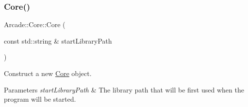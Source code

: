 \subsubsection{\texorpdfstring{Core()}{Core()}}
{\footnotesize\ttfamily Arcade\+::\+Core\+::\+Core (\begin{DoxyParamCaption}\item[{const std\+::string \&}]{start\+Library\+Path }\end{DoxyParamCaption})\hspace{0.3cm}{\ttfamily [explicit]}}



Construct a new \mbox{\hyperlink{classArcade_1_1Core}{Core}} object. 


\begin{DoxyParams}{Parameters}
{\em start\+Library\+Path} & The library path that will be first used when the program will be started. \\
\hline
\end{DoxyParams}
